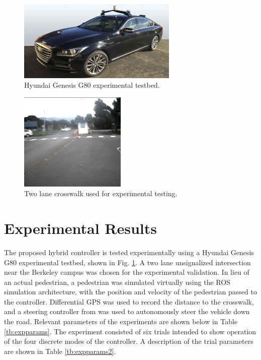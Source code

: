 \documentclass[letterpaper, 10 pt, conference]{ieeeconf} %
\begin{document}
\begin{figure}[h]
\centering
\includegraphics[width=3.0in]{figures/G80.jpg}
\caption{Hyundai Genesis G80 experimental testbed.}
\label{fig:g80}
\end{figure}

\begin{figure}[h]
\centering
\includegraphics[width=2.0in]{figures/crosswalkPic.png}
\caption{Two lane crosswalk used for experimental testing.}
\label{fig:crosswalkpic}
\end{figure}


\section{Experimental Results}
\label{sec:expres}


The proposed hybrid controller is tested experimentally using a Hyundai Genesis G80 experimental testbed, shown in Fig. \ref{fig:g80}. A two lane unsignalized intersection near the Berkeley campus was chosen for the experimental validation. In lieu of an actual pedestrian, a pedestrian was simulated virtually using the ROS simulation architecture, with the position and velocity of the pedestrian passed to the controller. Differential GPS was used to record the distance to the crosswalk, and a steering controller from \cite{Kapania2015} was used to autonomously steer the vehicle down the road. Relevant parameters of the experiments are shown below in Table \ref{tb:expparams}. The experiment consisted of six trials intended to show operation of the four discrete modes of the controller. A description of the trial parameters are shown in Table \ref{tb:expparams2}. 
\end{document}
